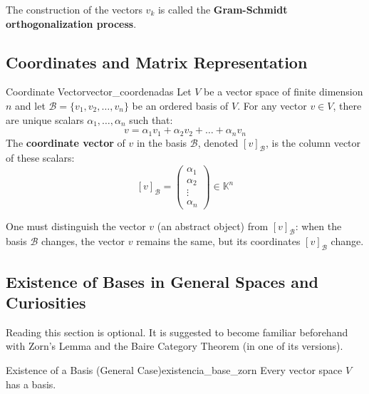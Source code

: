 \documentclass[11pt, a4paper]{article}
\begin{document}
\obs The construction of the vectors $v_k$ is called the \textbf{Gram-Schmidt orthogonalization process}.

\subsection{Coordinates and Matrix Representation}

\begin{definicion}{Coordinate Vector}{vector_coordenadas}
Let $V$ be a vector space of finite dimension $n$ and let $\mathcal{B} = \{v_1, v_2, \dots, v_n\}$ be an ordered basis of $V$.
For any vector $v \in V$, there are unique scalars $\alpha_1, \dots, \alpha_n$ such that:
\[ v = \alpha_1 v_1 + \alpha_2 v_2 + \dots + \alpha_n v_n \]
The \textbf{coordinate vector} of $v$ in the basis $\mathcal{B}$, denoted $[v]_\mathcal{B}$, is the column vector of these scalars:
\[ [v]_\mathcal{B} = \begin{pmatrix} \alpha_1 \\ \alpha_2 \\ \vdots \\ \alpha_n \end{pmatrix} \in \mathbb{K}^n \]
\end{definicion}

\obs One must distinguish the vector $v$ (an abstract object) from $[v]_\mathcal{B}$: when the basis $\mathcal{B}$ changes, the vector $v$ remains the same, but its coordinates $[v]_\mathcal{B}$ change.

\subsection{Existence of Bases in General Spaces and Curiosities}

Reading this section is optional. It is suggested to become familiar beforehand with Zorn's Lemma and the Baire Category Theorem (in one of its versions).

\begin{teorema}{Existence of a Basis (General Case)}{existencia_base_zorn}
Every vector space $V$ has a basis.
\end{teorema}
\end{document}

